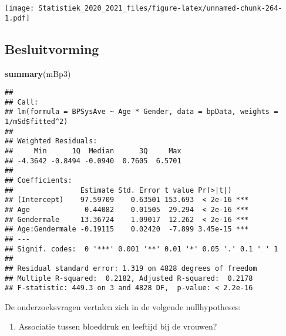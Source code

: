 \documentclass[
  12pt,dutch,coursenotes]{book}
\newenvironment{Shaded}{\begin{snugshade}}{\end{snugshade}}
\newcommand{\DataTypeTok}[1]{\textcolor[rgb]{0.13,0.29,0.53}{#1}}
\newcommand{\KeywordTok}[1]{\textcolor[rgb]{0.13,0.29,0.53}{\textbf{#1}}}
\newcommand{\NormalTok}[1]{#1}
\newcommand{\OperatorTok}[1]{\textcolor[rgb]{0.81,0.36,0.00}{\textbf{#1}}}
\newcommand{\StringTok}[1]{\textcolor[rgb]{0.31,0.60,0.02}{#1}}
\providecommand{\tightlist}{%
  \setlength{\itemsep}{0pt}\setlength{\parskip}{0pt}}
\theoremstyle{definition}
\theoremstyle{definition}
\theoremstyle{definition}
\theoremstyle{remark}
\begin{document}
\begin{Shaded}
\end{Shaded}

\texttt{[image: Statistiek\_2020\_2021\_files/figure-latex/unnamed-chunk-264-1.pdf]}

\hypertarget{besluitvorming}{%
\subsection{Besluitvorming}\label{besluitvorming}}

\begin{Shaded}
\begin{Highlighting}[]
\KeywordTok{summary}\NormalTok{(mBp3)}
\end{Highlighting}
\end{Shaded}

\begin{verbatim}
## 
## Call:
## lm(formula = BPSysAve ~ Age * Gender, data = bpData, weights = 1/mSd$fitted^2)
## 
## Weighted Residuals:
##     Min      1Q  Median      3Q     Max 
## -4.3642 -0.8494 -0.0940  0.7605  6.5701 
## 
## Coefficients:
##                Estimate Std. Error t value Pr(>|t|)    
## (Intercept)    97.59709    0.63501 153.693  < 2e-16 ***
## Age             0.44082    0.01505  29.294  < 2e-16 ***
## Gendermale     13.36724    1.09017  12.262  < 2e-16 ***
## Age:Gendermale -0.19115    0.02420  -7.899 3.45e-15 ***
## ---
## Signif. codes:  0 '***' 0.001 '**' 0.01 '*' 0.05 '.' 0.1 ' ' 1
## 
## Residual standard error: 1.319 on 4828 degrees of freedom
## Multiple R-squared:  0.2182, Adjusted R-squared:  0.2178 
## F-statistic: 449.3 on 3 and 4828 DF,  p-value: < 2.2e-16
\end{verbatim}

De onderzoeksvragen vertalen zich in de volgende nullhypotheses:

\begin{enumerate}
\def\labelenumi{\arabic{enumi}.}
\tightlist
\item
  Associatie tussen bloeddruk en leeftijd bij de vrouwen?
\end{enumerate}
\end{document}
